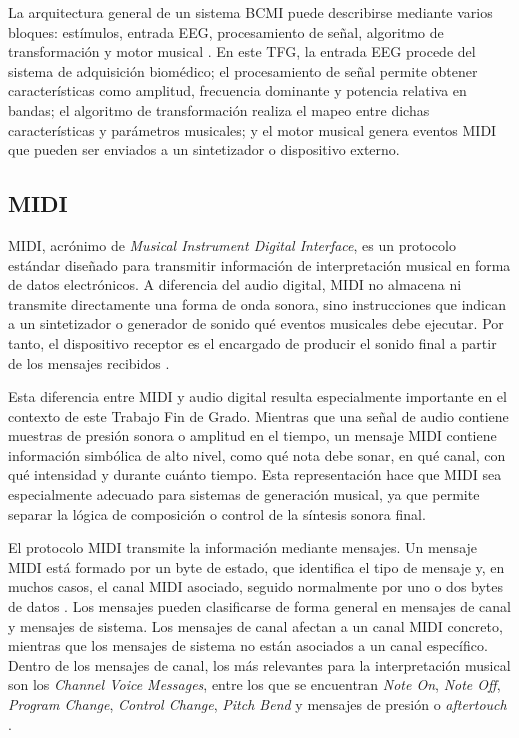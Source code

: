\documentclass[../main.tex]{subfiles}
\begin{document}
La arquitectura general de un sistema BCMI puede describirse mediante varios bloques: estímulos, entrada EEG, procesamiento de señal, algoritmo de transformación y motor musical \cite{EatonMiranda2014Mapping}. En este TFG, la entrada EEG procede del sistema de adquisición biomédico; el procesamiento de señal permite obtener características como amplitud, frecuencia dominante y potencia relativa en bandas; el algoritmo de transformación realiza el mapeo entre dichas características y parámetros musicales; y el motor musical genera eventos MIDI que pueden ser enviados a un sintetizador o dispositivo externo.

\subsection{MIDI}

MIDI, acrónimo de \textit{Musical Instrument Digital Interface}, es un protocolo estándar diseñado para transmitir información de interpretación musical en forma de datos electrónicos. A diferencia del audio digital, MIDI no almacena ni transmite directamente una forma de onda sonora, sino instrucciones que indican a un sintetizador o generador de sonido qué eventos musicales debe ejecutar. Por tanto, el dispositivo receptor es el encargado de producir el sonido final a partir de los mensajes recibidos \cite{Heckroth1995}.

Esta diferencia entre MIDI y audio digital resulta especialmente importante en el contexto de este Trabajo Fin de Grado. Mientras que una señal de audio contiene muestras de presión sonora o amplitud en el tiempo, un mensaje MIDI contiene información simbólica de alto nivel, como qué nota debe sonar, en qué canal, con qué intensidad y durante cuánto tiempo. Esta representación hace que MIDI sea especialmente adecuado para sistemas de generación musical, ya que permite separar la lógica de composición o control de la síntesis sonora final.

El protocolo MIDI transmite la información mediante mensajes. Un mensaje MIDI está formado por un byte de estado, que identifica el tipo de mensaje y, en muchos casos, el canal MIDI asociado, seguido normalmente por uno o dos bytes de datos \cite{Heckroth1995}. Los mensajes pueden clasificarse de forma general en mensajes de canal y mensajes de sistema. Los mensajes de canal afectan a un canal MIDI concreto, mientras que los mensajes de sistema no están asociados a un canal específico. Dentro de los mensajes de canal, los más relevantes para la interpretación musical son los \textit{Channel Voice Messages}, entre los que se encuentran \textit{Note On}, \textit{Note Off}, \textit{Program Change}, \textit{Control Change}, \textit{Pitch Bend} y mensajes de presión o \textit{aftertouch} \cite{Heckroth1995}.
\end{document}
